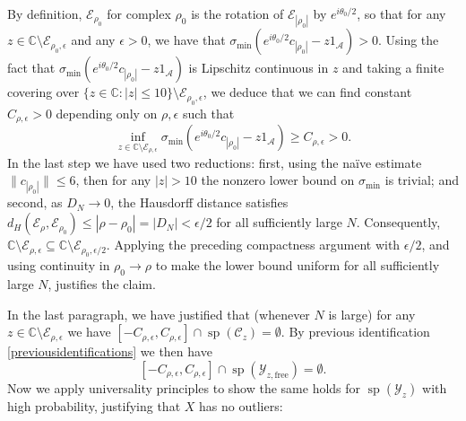 \documentclass[11pt,reqno]{amsart}
\theoremstyle{plain}
\theoremstyle{remark}
\numberwithin{equation}{section}
\begin{document}
By definition, $\mathcal{E}_{\rho_0}$ for complex $\rho_0$ is the rotation of $\mathcal{E}_{|\rho_0|}$ by $e^{i\theta_0/2}$, so that for any $z\in\mathbb{C}\setminus\mathcal{E}_{\rho_0,\epsilon}$ and any $\epsilon>0$, we have that $\sigma_{\min}(e^{i\theta_0/2}c_{|\rho_0|}-z1_\mathcal{A})>0$. Using the fact that $\sigma_{\min}(e^{i\theta_0/2}c_{|\rho_0|} -z1_\mathcal{A})$ is Lipschitz continuous in $z$ and taking a finite covering over $\{z\in\mathbb{C}:|z|\leq 10\}\setminus\mathcal{E}_{\rho_0,\epsilon}$, we deduce that we can find constant $C_{\rho,\epsilon}>0$ depending only on $\rho,\epsilon$ such that 
$$\inf_{z\in \mathbb{C}\setminus\mathcal{E}_{\rho,\epsilon}} \sigma_{\min}(e^{i\theta_0/2}c_{|\rho_0|}-z1_{\mathcal{A}})\geq C_{\rho,\epsilon}>0.$$ In the last step we have used two reductions: first, using the naïve estimate $\|c_{|\rho_0|}\|\leq 6$, then for any $|z|>10$ the nonzero lower bound on $\sigma_{\min}$ is trivial; and second, as $D_N\to 0$, the Hausdorff distance satisfies $d_H(\mathcal{E}_{\rho},\mathcal{E}_{\rho_0})\leq|\rho-\rho_0|=|D_N|<\epsilon/2$ for all sufficiently large $N$. Consequently, $\mathbb{C}\setminus\mathcal{E}_{\rho,\epsilon}\subseteq\mathbb{C}\setminus\mathcal{E}_{\rho_0,\epsilon/2}$. Applying the preceding compactness argument with $\epsilon/2$, and using continuity in $\rho_0\to\rho$ to make the lower bound uniform for all sufficiently large $N$, justifies the claim.   

In the last paragraph, we have justified that (whenever $N$ is large) for any $z\in \mathbb{C}\setminus\mathcal{E}_{\rho,\epsilon}$ we have $[-C_{\rho,\epsilon},C_{\rho,\epsilon}]\cap \operatorname{sp}(\mathcal{C}_z)=\emptyset$. By previous identification \eqref{previousidentifications} we then have \begin{equation}\label{yzfree}[-C_{\rho,\epsilon},C_{\rho,\epsilon}]\cap \operatorname{sp}(\mathcal{Y}_{z,\text{free}})=\emptyset.\end{equation} Now we apply universality principles to show the same holds for $\operatorname{sp}(\mathcal{Y}_z)$ with high probability, justifying that $X$ has no outliers:
\end{document}
